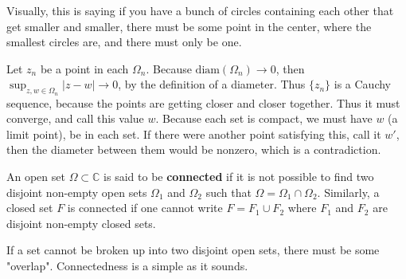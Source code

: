 \documentclass[12pt]{article}
\newcommand{\C}{\mathbb{C}}
\begin{document}
Visually, this is saying if you have a bunch of circles containing each other that get smaller and smaller, 
there must be some point in the center, where the smallest circles are, and there must only be one. 

\begin{newproof}
  Let $z_n$ be a point in each $\Omega_n$. Because $\text{diam}(\Omega_n) \to 0$, then 
  $\sup_{z,w \in \Omega_n} \vert z - w \vert \to 0$, by the definition of a diameter. Thus $\{ z_n \}$ is 
  a Cauchy sequence, because the points are getting closer and closer together. Thus it must converge, and 
  call this value $w$. Because each set is compact, we must have $w$ (a limit point), be in each set. If there 
  were another point satisfying this, call it $w'$, then the diameter between them would be nonzero, which is 
  a contradiction.
\end{newproof}

\begin{definition}
  An open set $\Omega \subset \C$ is said to be \textbf{connected} if it is not possible to find two disjoint 
  non-empty open sets $\Omega_1$ and $\Omega_2$ such that $\Omega = \Omega_1 \cap \Omega_2$. 
  Similarly, a closed set $F$ is connected if one cannot write $F = F_1 \cup F_2$ where $F_1$ and 
  $F_2$ are disjoint non-empty closed sets.
\end{definition}

If a set cannot be broken up into two disjoint open sets, there must be some "overlap". Connectedness 
is a  simple as it sounds.
\end{document}
